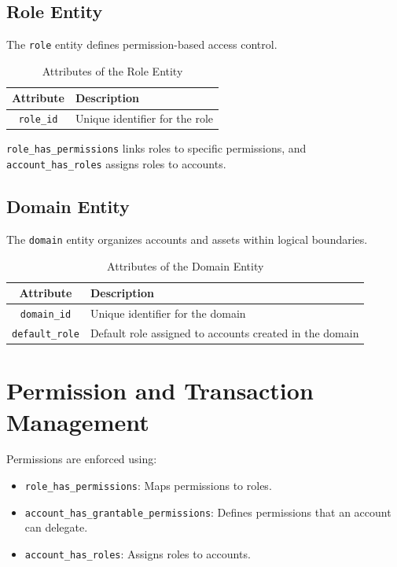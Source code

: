 \documentclass{article}
\begin{document}
\subsection{Role Entity}
The \texttt{role} entity defines permission-based access control.

\begin{table}[h]
      \centering
      \caption{Attributes of the Role Entity}
      \label{tab:role_attributes}
      \begin{tabular}{|c|l|}
            \hline
            \textbf{Attribute} & \textbf{Description}           \\ \hline
            \texttt{role\_id}  & Unique identifier for the role \\ \hline
      \end{tabular}
\end{table}

\texttt{role\_has\_permissions} links roles to specific permissions, and \texttt{account\_has\_roles} assigns roles to accounts.

\subsection{Domain Entity}
The \texttt{domain} entity organizes accounts and assets within logical boundaries.

\begin{table}[h]
      \centering
      \caption{Attributes of the Domain Entity}
      \label{tab:domain_attributes}
      \begin{tabular}{|c|l|}
            \hline
            \textbf{Attribute}     & \textbf{Description}                                    \\ \hline
            \texttt{domain\_id}    & Unique identifier for the domain                        \\ \hline
            \texttt{default\_role} & Default role assigned to accounts created in the domain \\ \hline
      \end{tabular}
\end{table}

\section{Permission and Transaction Management}
Permissions are enforced using:
\begin{itemize}
      \item \texttt{role\_has\_permissions}: Maps permissions to roles.
      \item \texttt{account\_has\_grantable\_permissions}: Defines permissions that an account can delegate.
      \item \texttt{account\_has\_roles}: Assigns roles to accounts.
\end{itemize}
\end{document}
